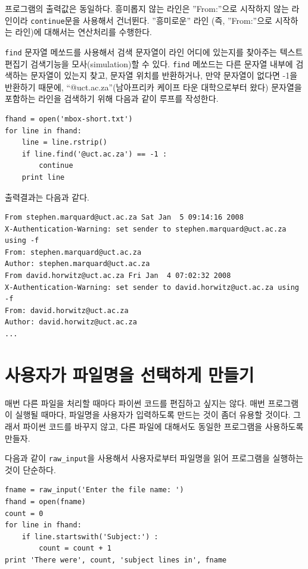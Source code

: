 프로그램의 출력값은 동일하다. 
흥미롭지 않는 라인은 ''From:''으로 시작하지 않는 라인이라 {\tt continue}문을 사용해서 건너뛴다.
''흥미로운'' 라인 (즉, ''From:''으로 시작하는 라인)에 대해서는 연산처리를 수행한다. 

{\tt find} 문자열 메쏘드를 사용해서 검색 문자열이 라인 어디에 있는지를 찾아주는 텍스트 편집기 검색기능을 모사(simulation)할 수 있다.
{\tt find} 메쏘드는 다른 문자열 내부에 검색하는 문자열이 있는지 찾고, 문자열 위치를 반환하거나, 만약 문자열이 없다면 -1을 반환하기 때문에,
``@uct.ac.za''(남아프리카 케이프 타운 대학으로부터 왔다) 문자열을 포함하는 라인을 검색하기 위해 다음과 같이 루프를 작성한다.

\beforeverb
\begin{verbatim}
fhand = open('mbox-short.txt')
for line in fhand:
    line = line.rstrip()
    if line.find('@uct.ac.za') == -1 : 
        continue
    print line
\end{verbatim}
\afterverb
%
출력결과는 다음과 같다.

\beforeverb
\begin{verbatim}
From stephen.marquard@uct.ac.za Sat Jan  5 09:14:16 2008
X-Authentication-Warning: set sender to stephen.marquard@uct.ac.za using -f
From: stephen.marquard@uct.ac.za
Author: stephen.marquard@uct.ac.za
From david.horwitz@uct.ac.za Fri Jan  4 07:02:32 2008
X-Authentication-Warning: set sender to david.horwitz@uct.ac.za using -f
From: david.horwitz@uct.ac.za
Author: david.horwitz@uct.ac.za
...
\end{verbatim}
\afterverb
%

\section{사용자가 파일명을 선택하게 만들기}

매번 다른 파일을 처리할 때마다 파이썬 코드를 편집하고 싶지는 않다. 
매번 프로그램이 실행될 때마다, 파일명을 사용자가 입력하도록 만드는 것이 좀더 유용할 것이다. 
그래서 파이썬 코드를 바꾸지 않고, 다른 파일에 대해서도 동일한 프로그램을 사용하도록 만들자.

다음과 같이 \verb"raw_input"을 사용해서 사용자로부터 파일명을 읽어 프로그램을 실행하는 것이 단순하다.

\beforeverb
\begin{verbatim}
fname = raw_input('Enter the file name: ')
fhand = open(fname)
count = 0
for line in fhand:
    if line.startswith('Subject:') :
        count = count + 1
print 'There were', count, 'subject lines in', fname
\end{verbatim}
\afterverb
%

